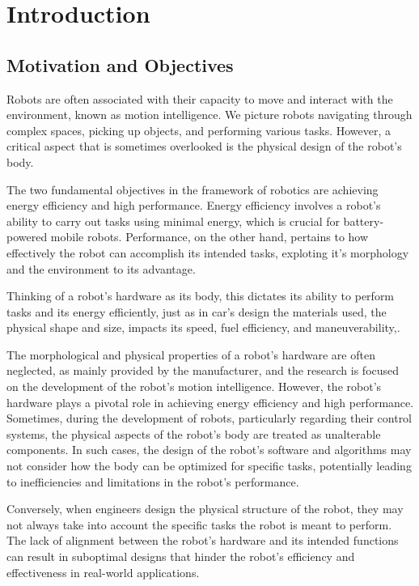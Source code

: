 \chapter*{Introduction}
\label{chp:00-Prologue}

\section*{Motivation and Objectives}

Robots are often associated with their capacity to move and interact with the environment, known as motion intelligence. We picture robots navigating through complex spaces, picking up objects, and performing various tasks. However, a critical aspect that is sometimes overlooked is the physical design of the robot's body.

The two fundamental objectives in the framework of robotics are achieving energy efficiency and high performance. Energy efficiency involves a robot's ability to carry out tasks using minimal energy, which is crucial for battery-powered mobile robots. Performance, on the other hand, pertains to how effectively the robot can accomplish its intended tasks, exploting it's morphology and the environment to its advantage.

Thinking of a robot's hardware as its body, this dictates its ability to perform tasks and its energy efficiently, just as in car's design the materials used, the physical shape and size, impacts its speed, fuel efficiency, and maneuverability,.

The morphological and physical properties of a robot's hardware are often neglected, as mainly provided by the manufacturer, and the research is focused on the development of the robot's motion intelligence. However, the robot's hardware plays a pivotal role in achieving energy efficiency and high performance.
Sometimes, during the development of robots, particularly regarding their control systems, the physical aspects of the robot's body are treated as unalterable components. In such cases, the design of the robot's software and algorithms may not consider how the body can be optimized for specific tasks, potentially leading to inefficiencies and limitations in the robot's performance.

Conversely, when engineers design the physical structure of the robot, they may not always take into account the specific tasks the robot is meant to perform. The lack of alignment between the robot's hardware and its intended functions can result in suboptimal designs that hinder the robot's efficiency and effectiveness in real-world applications.

